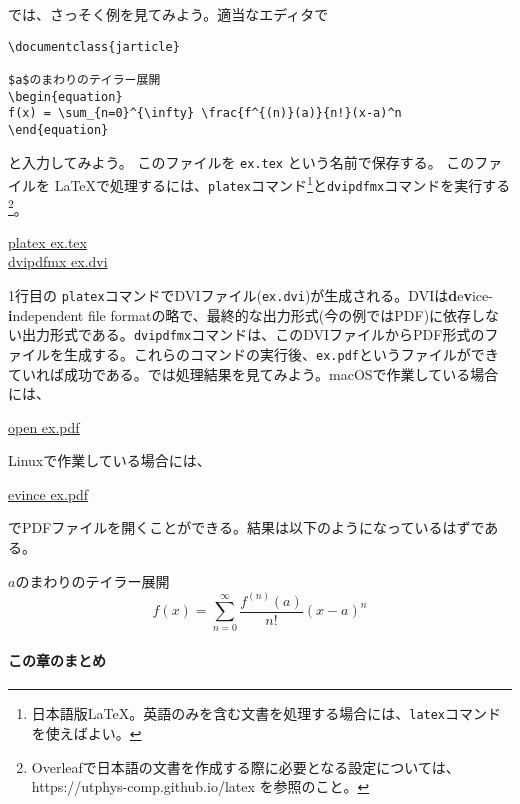 では、さっそく例を見てみよう。適当なエディタで
\begin{reidai}
\label{reidai:latex:ex}
\begin{verbatim}
\documentclass{jarticle}

$a$のまわりのテイラー展開
\begin{equation}
f(x) = \sum_{n=0}^{\infty} \frac{f^{(n)}(a)}{n!}(x-a)^n
\end{equation}

\end{verbatim}
\end{reidai} \noindent
と入力してみよう。
このファイルを \texttt{ex.tex} という名前で保存する。
このファイルを \LaTeX で処理するには、\texttt{platex}コマンド\footnote{日本語版\LaTeX 。英語のみを含む文書を処理する場合には、\texttt{latex}コマンドを使えばよい。}と\texttt{dvipdfmx}コマンドを実行する\footnote{Overleafで日本語の文書を作成する際に必要となる設定については、 https://utphys-comp.github.io/latex を参照のこと。}。
\begin{commandline2}
\prompt \underline{platex ex.tex}\\
\prompt \underline{dvipdfmx ex.dvi}
\end{commandline2} \noindent
1行目の \texttt{platex}コマンドでDVIファイル(\texttt{ex.dvi})が生成される。DVIは{\textbf{d}e\textbf{v}ice-\textbf{i}ndependent file format}の略で、最終的な出力形式(今の例ではPDF)に依存しない出力形式である。\texttt{dvipdfmx}コマンドは、このDVIファイルからPDF形式のファイルを生成する。これらのコマンドの実行後、\texttt{ex.pdf}というファイルができていれば成功である。では処理結果を見てみよう。macOSで作業している場合には、
\begin{commandline2}
\prompt \underline{open ex.pdf}
\end{commandline2} \noindent
Linuxで作業している場合には、
\begin{commandline2}
\prompt \underline{evince ex.pdf}
\end{commandline2} \noindent
でPDFファイルを開くことができる。結果は以下のようになっているはずである。
\renewcommand{\theequation}{1}
\begin{kekka}
\label{kekka:ex}
$a$のまわりのテイラー展開
\begin{equation}
 f(x) = \sum_{n=0}^{\infty} \frac{f^{(n)}(a)}{n!}(x-a)^n
\end{equation}
\vspace{0pt}
\end{kekka}

\paragraph{この章のまとめ}

